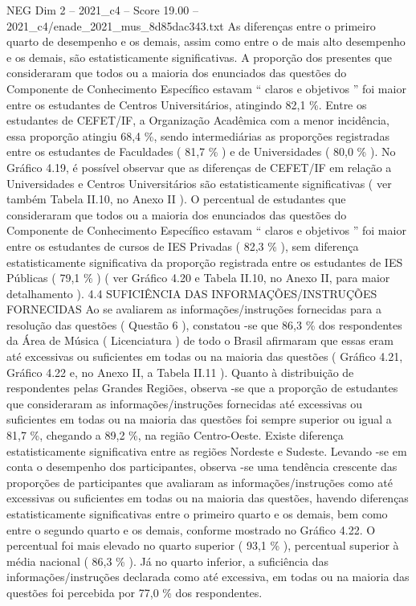 \begin{textsample}{NEG Dim 2 – 2021\_c4 – Score 19.00 – 2021\_c4/enade\_2021\_mus\_8d85dac343.txt}
As diferenças entre o primeiro quarto de desempenho e os demais, assim como entre o de mais alto desempenho e os demais, são estatisticamente significativas.
A proporção dos presentes que consideraram que todos ou a maioria dos enunciados das questões do Componente de Conhecimento Específico estavam “ claros e objetivos ” foi maior entre os estudantes de Centros Universitários, atingindo 82,1 \%.
Entre os estudantes de CEFET/IF, a Organização Acadêmica com a menor incidência, essa proporção atingiu 68,4 \%, sendo intermediárias as proporções registradas entre os estudantes de Faculdades ( 81,7 \% ) e de Universidades ( 80,0 \% ).
No Gráfico 4.19, é possível observar que as diferenças de CEFET/IF em relação a Universidades e Centros Universitários são estatisticamente significativas ( ver também Tabela II.10, no Anexo II ).
O percentual de estudantes que consideraram que todos ou a maioria dos enunciados das questões do Componente de Conhecimento Específico estavam “ claros e objetivos ” foi maior entre os estudantes de cursos de IES Privadas ( 82,3 \% ), sem diferença estatisticamente significativa da proporção registrada entre os estudantes de IES Públicas ( 79,1 \% ) ( ver Gráfico 4.20 e Tabela II.10, no Anexo II, para maior detalhamento ). 4.4 SUFICIÊNCIA DAS INFORMAÇÕES/INSTRUÇÕES FORNECIDAS Ao se avaliarem as informações/instruções fornecidas para a resolução das questões ( Questão 6 ), constatou -se que 86,3 \% dos respondentes da Área de Música ( Licenciatura ) de todo o Brasil afirmaram que essas eram até excessivas ou suficientes em todas ou na maioria das questões ( Gráfico 4.21, Gráfico 4.22 e, no Anexo II, a Tabela II.11 ).
Quanto à distribuição de respondentes pelas Grandes Regiões, observa -se que a proporção de estudantes que consideraram as informações/instruções fornecidas até excessivas ou suficientes em todas ou na maioria das questões foi sempre superior ou igual a 81,7 \%, chegando a 89,2 \%, na região Centro-Oeste.
Existe diferença estatisticamente significativa entre as regiões Nordeste e Sudeste.
Levando -se em conta o desempenho dos participantes, observa -se uma tendência crescente das proporções de participantes que avaliaram as informações/instruções como até excessivas ou suficientes em todas ou na maioria das questões, havendo diferenças estatisticamente significativas entre o primeiro quarto e os demais, bem como entre o segundo quarto e os demais, conforme mostrado no Gráfico 4.22.
O percentual foi mais elevado no quarto superior ( 93,1 \% ), percentual superior à média nacional ( 86,3 \% ).
Já no quarto inferior, a suficiência das informações/instruções declarada como até excessiva, em todas ou na maioria das questões foi percebida por 77,0 \% dos respondentes.

\end{textsample}
